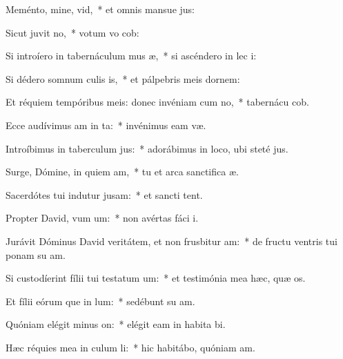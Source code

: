 \item Meménto, mine, vid,~* et omnis mansue jus:
\item Sicut juvit no,~* votum vo  cob:
\item Si introíero in tabernáculum mus æ,~* si ascéndero in lec  i:
\item Si dédero somnum culis is,~* et pálpebris meis dornem:
\item Et réquiem tempóribus meis: donec invéniam cum no,~* tabernácu  cob.
\item Ecce audívimus am in ta:~* invénimus eam   væ.
\item Introíbimus in taberculum jus:~* adorábimus in loco, ubi steté  jus.
\item Surge, Dómine, in quiem am,~* tu et arca sanctifica æ.
\item Sacerdótes tui indutur jusam:~* et sancti  tent.
\item Propter David, vum um:~* non avértas fáci  i.
\item Jurávit Dóminus David veritátem, et non frusbitur am:~* de fructu ventris tui ponam su  am.
\item Si custodíerint fílii tui testatum um:~* et testimónia mea hæc, quæ  os.
\item Et fílii eórum que in lum:~* sedébunt su  am.
\item Quóniam elégit minus on:~* elégit eam in habita bi.
\item Hæc réquies mea in culum li:~* hic habitábo, quóniam  am.
